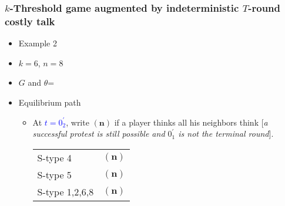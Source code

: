 \documentclass[9pt]{beamer}
\begin{document}
\begin{frame}
  \frametitle{$k$-Threshold game augmented by indeterministic $T$-round costly talk}

\begin{itemize}
\item Example 2
\item $k=6$, $n=8$
\item $G$ and $\theta$=
\begin{center}
\end{center}
\end{itemize}

\begin{itemize}
\item Equilibrium path
\begin{itemize}
\item 
{
At \textcolor{blue}{$t=0^{'}_2$}, write $({\textbf{n}})$ if a player thinks all his neighbors think \alert{[}\textit{a successful protest is still possible and $0^{'}_1$ is not the terminal round}\alert{]}. 
\begin{table}[h]
\begin{tabular}{ll }
S-type 4 & $({\textbf{n}})$\\
S-type 5 & $({\textbf{n}})$\\
S-type 1,2,6,8 & $({\textbf{n}})$
\end{tabular}
\end{table}
} 
\end{itemize}

\end{itemize}
\end{frame}
\end{document}

